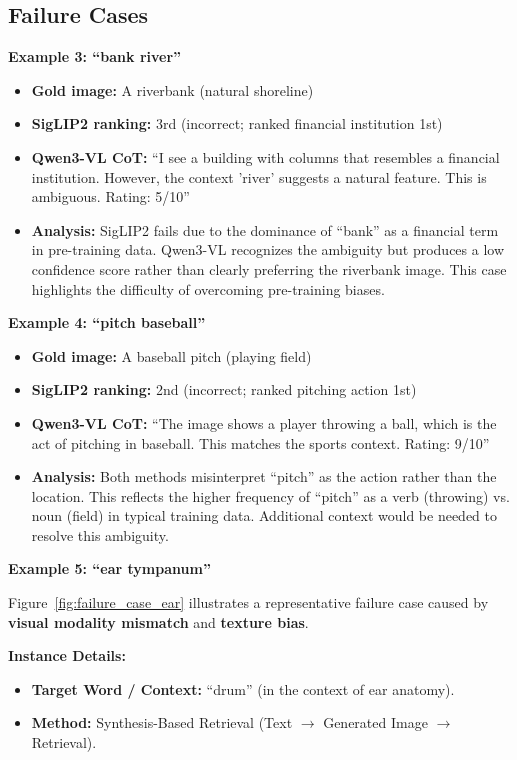\documentclass[11pt]{article}
\begin{document}
\subsection{Failure Cases}

\textbf{Example 3: ``bank river''}
\begin{itemize}
    \item \textbf{Gold image:} A riverbank (natural shoreline)
    \item \textbf{SigLIP2 ranking:} 3rd (incorrect; ranked financial institution 1st)
    \item \textbf{Qwen3-VL CoT:} ``I see a building with columns that resembles a financial institution. However, the context 'river' suggests a natural feature. This is ambiguous. Rating: 5/10''
    \item \textbf{Analysis:} SigLIP2 fails due to the dominance of ``bank'' as a financial term in pre-training data. Qwen3-VL recognizes the ambiguity but produces a low confidence score rather than clearly preferring the riverbank image. This case highlights the difficulty of overcoming pre-training biases.
\end{itemize}

\textbf{Example 4: ``pitch baseball''}
\begin{itemize}
    \item \textbf{Gold image:} A baseball pitch (playing field)
    \item \textbf{SigLIP2 ranking:} 2nd (incorrect; ranked pitching action 1st)
    \item \textbf{Qwen3-VL CoT:} ``The image shows a player throwing a ball, which is the act of pitching in baseball. This matches the sports context. Rating: 9/10''
    \item \textbf{Analysis:} Both methods misinterpret ``pitch'' as the action rather than the location. This reflects the higher frequency of ``pitch'' as a verb (throwing) vs. noun (field) in typical training data. Additional context would be needed to resolve this ambiguity.
\end{itemize}

\textbf{Example 5: ``ear tympanum''}
\label{sec:failure_visual_mismatch}

Figure~\ref{fig:failure_case_ear} illustrates a representative failure case caused by \textbf{visual modality mismatch} and \textbf{texture bias}.

\textbf{Instance Details:}
\begin{itemize}
    \item \textbf{Target Word / Context:} ``drum'' (in the context of ear anatomy).
    \item \textbf{Method:} Synthesis-Based Retrieval (Text $\rightarrow$ Generated Image $\rightarrow$ Retrieval).
\end{itemize}
\end{document}
